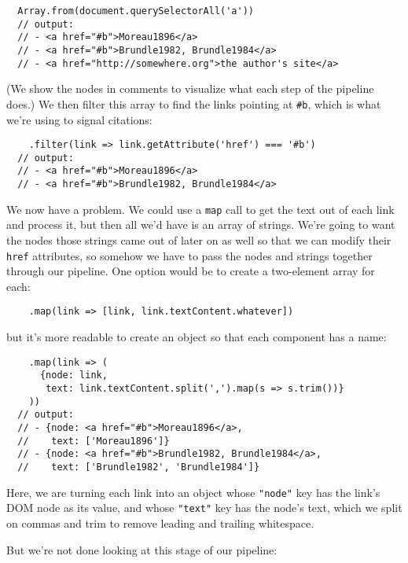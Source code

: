 \begin{verbatim}
  Array.from(document.querySelectorAll('a'))
  // output:
  // - <a href="#b">Moreau1896</a>
  // - <a href="#b">Brundle1982, Brundle1984</a>
  // - <a href="http://somewhere.org">the author's site</a>
\end{verbatim}

\noindent
(We show the nodes in comments to visualize what each step of the pipeline does.)
We then filter this array to find the links pointing at \texttt{\#b},
which is what we're using to signal citations:

\begin{verbatim}
    .filter(link => link.getAttribute('href') === '#b')
  // output:
  // - <a href="#b">Moreau1896</a>
  // - <a href="#b">Brundle1982, Brundle1984</a>
\end{verbatim}

We now have a problem.
We could use a \texttt{map} call to get the text out of each link and process it,
but then all we'd have is an array of strings.
We're going to want the nodes those strings came out of later on as well
so that we can modify their \texttt{href} attributes,
so somehow we have to pass the nodes and strings together through our pipeline.
One option would be to create a two-element array for each:

\begin{verbatim}
    .map(link => [link, link.textContent.whatever])
\end{verbatim}

\noindent
but it's more readable to create an object so that each component has a name:

\begin{verbatim}
    .map(link => (
      {node: link,
       text: link.textContent.split(',').map(s => s.trim())}
    ))
  // output:
  // - {node: <a href="#b">Moreau1896</a>,
  //    text: ['Moreau1896']}
  // - {node: <a href="#b">Brundle1982, Brundle1984</a>,
  //    text: ['Brundle1982', 'Brundle1984']}
\end{verbatim}

Here,
we are turning each link into an object whose \texttt{"node"} key has the link's DOM node as its value,
and whose \texttt{"text"} key has the node's text,
which we split on commas and trim to remove leading and trailing whitespace.

But we're not done looking at this stage of our pipeline:

